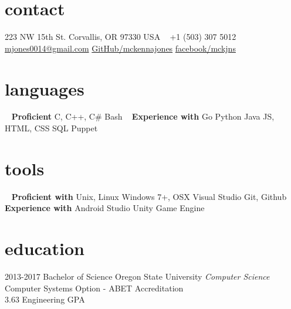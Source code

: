 \documentclass[1]{friggeri-cv} %
\begin{document}


\begin{aside} %
\section{contact}
223 NW 15th St.
Corvallis, OR 97330
USA
~
+1 (503) 307 5012
~
\href{mailto:mjones0014@gmail.com}{mjones0014@gmail.com}
\href{https://github.com/mckennajones}{GitHub/mckennajones}
\href{http://facebook.com/mckjns}{facebook/mckjns}
\section{languages}
~
\textbf{Proficient}
C, C++, C\#
Bash
~
\textbf{Experience with}
Go
Python
Java
JS, HTML, CSS
SQL
Puppet
\section{tools}
~
\textbf{Proficient with}
Unix, Linux
Windows 7+, OSX
Visual Studio
Git, Github
~
\textbf{Experience with}
Android Studio
Unity Game Engine
\end{aside}


\section{education}

\begin{entrylist}


\entry
{2013-2017}
{Bachelor {\normalfont of Science}}
{Oregon State University}
{\emph{Computer Science} \\ Computer Systems Option - ABET Accreditation \\ 3.63 Engineering GPA}
\end{entrylist}

\end{document}
